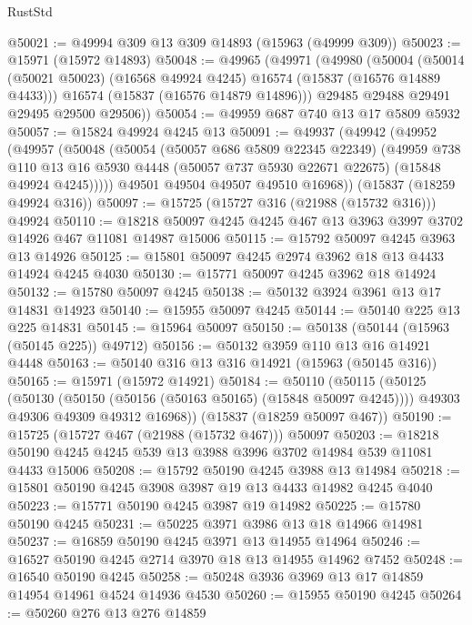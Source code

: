 \begin{lexlean}{RustStd}
\begin{coremodule}
@50021 := @49994 @309 @13 @309 @14893 (@15963 (@49999 @309))
@50023 := @15971 (@15972 @14893)
@50048 := @49965
    (@49971
      (@49980
        (@50004
          (@50014 (@50021 @50023) (@16568 @49924 @4245) @16574 (@15837 (@16576 @14889 @4433)))
          @16574
          (@15837 (@16576 @14879 @14896)))
        @29485
        @29488
        @29491
        @29495
        @29500
        @29506))
@50054 := @49959 @687 @740 @13 @17 @5809 @5932
@50057 := @15824 @49924 @4245 @13
@50091 := @49937
    (@49942
      (@49952
        (@49957
          (@50048
            (@50054
              (@50057 @686 @5809 @22345 @22349)
              (@49959
                @738
                @110
                @13
                @16
                @5930
                @4448
                (@50057 @737 @5930 @22671 @22675)
                (@15848 @49924 @4245)))))
        @49501
        @49504
        @49507
        @49510
        @16968))
    (@15837 (@18259 @49924 @316))
@50097 := @15725 (@15727 @316 (@21988 (@15732 @316))) @49924
@50110 := @18218 @50097 @4245 @4245 @467 @13 @3963 @3997 @3702 @14926 @467 @11081 @14987 @15006
@50115 := @15792 @50097 @4245 @3963 @13 @14926
@50125 := @15801 @50097 @4245 @2974 @3962 @18 @13 @4433 @14924 @4245 @4030
@50130 := @15771 @50097 @4245 @3962 @18 @14924
@50132 := @15780 @50097 @4245
@50138 := @50132 @3924 @3961 @13 @17 @14831 @14923
@50140 := @15955 @50097 @4245
@50144 := @50140 @225 @13 @225 @14831
@50145 := @15964 @50097
@50150 := @50138 (@50144 (@15963 (@50145 @225)) @49712)
@50156 := @50132 @3959 @110 @13 @16 @14921 @4448
@50163 := @50140 @316 @13 @316 @14921 (@15963 (@50145 @316))
@50165 := @15971 (@15972 @14921)
@50184 := @50110
    (@50115
      (@50125
        (@50130 (@50150 (@50156 (@50163 @50165) (@15848 @50097 @4245))))
        @49303
        @49306
        @49309
        @49312
        @16968))
    (@15837 (@18259 @50097 @467))
@50190 := @15725 (@15727 @467 (@21988 (@15732 @467))) @50097
@50203 := @18218 @50190 @4245 @4245 @539 @13 @3988 @3996 @3702 @14984 @539 @11081 @4433 @15006
@50208 := @15792 @50190 @4245 @3988 @13 @14984
@50218 := @15801 @50190 @4245 @3908 @3987 @19 @13 @4433 @14982 @4245 @4040
@50223 := @15771 @50190 @4245 @3987 @19 @14982
@50225 := @15780 @50190 @4245
@50231 := @50225 @3971 @3986 @13 @18 @14966 @14981
@50237 := @16859 @50190 @4245 @3971 @13 @14955 @14964
@50246 := @16527 @50190 @4245 @2714 @3970 @18 @13 @14955 @14962 @7452
@50248 := @16540 @50190 @4245
@50258 := @50248 @3936 @3969 @13 @17 @14859 @14954 @14961 @4524 @14936 @4530
@50260 := @15955 @50190 @4245
@50264 := @50260 @276 @13 @276 @14859

\end{coremodule}
\end{lexlean}
